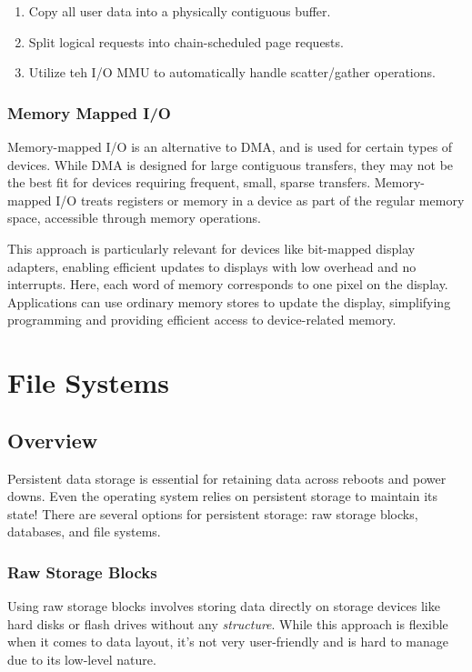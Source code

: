 \documentclass{report}
\newcommand{\exampleBegin}[1]{\begin{tcolorbox}[colback=blue!5!white,colframe=black!75!blue,title={Example:
      #1}]}
\newcommand{\exampleEnd}{\end{tcolorbox}}
\begin{document}
\begin{enumerate}[label=\textit{(\roman*)}]
\item Copy all user data into a physically contiguous buffer.
\item Split logical requests into chain-scheduled page requests.
\item Utilize teh I/O MMU to automatically handle scatter/gather operations.
\end{enumerate}

\subsection{Memory Mapped I/O}
Memory-mapped I/O is an alternative to DMA, and is used for certain types of devices. While DMA is
designed for large contiguous transfers, they may not be the best fit for devices requiring
frequent, small, sparse transfers. Memory-mapped I/O treats registers or memory in a device as part
of the regular memory space, accessible through memory operations.

\exampleBegin{Display Adapters}
This approach is particularly relevant for devices like bit-mapped display adapters, enabling
efficient updates to displays with low overhead and no interrupts. Here, each word of memory
corresponds to one pixel on the display. Applications can use ordinary memory stores to update the
display, simplifying programming and providing efficient access to device-related memory.
\exampleEnd










\chapter{File Systems}
\section{Overview}
Persistent data storage is essential for retaining data across reboots and power downs. Even the
operating system relies on persistent storage to maintain its state! There are several options for
persistent storage: raw storage blocks, databases, and file systems.

\subsection*{Raw Storage Blocks}
Using raw storage blocks involves storing data directly on storage devices like hard disks or flash
drives without any \textit{structure}. While this approach is flexible when it comes to data layout,
it's not very user-friendly and is hard to manage due to its low-level nature.
\end{document}

